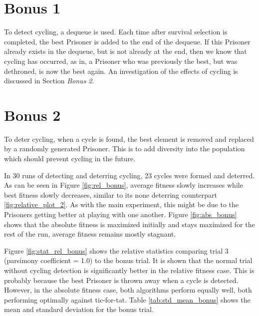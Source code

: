 \documentclass[times]{article}
\begin{document}
	\section{Bonus 1}
	To detect cycling, a dequeue is used. Each time after survival selection is completed, the best Prisoner is added to the end of the dequeue. If this Prisoner already exists in the dequeue, but is not already at the end, then we know that cycling has occurred, as in, a Prisoner who was previously the best, but was dethroned, is now the best again. An investigation of the effects of cycling is discussed in Section \textit{Bonus 2}.

	\section{Bonus 2}
	To deter cycling, when a cycle is found, the best element is removed and replaced by a randomly generated Prisoner. This is to add diversity into the population which should prevent cycling in the future.

	In 30 runs of detecting and deterring cycling, 23 cycles were formed and deterred. As can be seen in Figure \ref{fig:rel_bonus}, average fitness slowly increases while best fitness slowly decreases, similar to its none deterring counterpart \ref{fig:relative_plot_2}. As with the main experiment, this might be due to the Prisoners getting better at playing with one another. Figure \ref{fig:abs_bonus} shows that the absolute fitness is maximized initially and stays maximized for the rest of the run, average fitness remains mostly stagnant.

	Figure \ref{fig:stat_rel_bonus} shows the relative statistics comparing trial 3 (parsimony coefficient = 1.0) to the bonus trial. It is shown that the normal trial without cycling detection is significantly better in the relative fitness case. This is probably because the best Prisoner is thrown away when a cycle is detected. However, in the absolute fitness case, both algorithms perform equally well, both performing optimally against tic-for-tat. Table \ref{tab:std_mean_bonus} shows the mean and standard deviation for the bonus trial.
\end{document}
